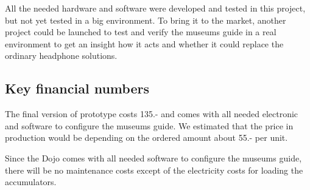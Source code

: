 All the needed hardware and software were developed and tested in this project, but not yet tested in a big environment. To bring it to the market, another project could be launched to test and verify the museums guide in a real environment to get an insight how it acts and whether it could replace the ordinary headphone solutions.

\subsection*{Key financial numbers}

The final version of prototype costs 135.- and comes with all needed electronic and software to configure the museums guide. We estimated that the price in production would be depending on the ordered amount about 55.- per unit.

Since the Dojo comes with all needed software to configure the museums guide, there will be no maintenance costs except of the electricity costs for loading the accumulators.